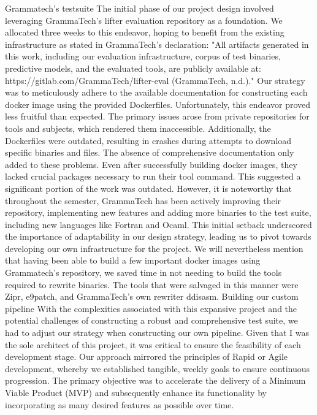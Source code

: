 \documentclass[a4paper,11pt,oneside]{report}
\begin{document}
Grammatech’s testsuite
The initial phase of our project design involved leveraging GrammaTech's lifter
evaluation repository as a foundation. We allocated three weeks to this endeavor, hoping to
benefit from the existing infrastructure as stated in GrammaTech's declaration:
"All artifacts generated in this work, including our evaluation infrastructure, corpus
of test binaries, predictive models, and the evaluated tools, are publicly available at:
https://gitlab.com/GrammaTech/lifter-eval (GrammaTech, n.d.)."
Our strategy was to meticulously adhere to the available documentation for
constructing each docker image using the provided Dockerfiles. Unfortunately, this
endeavor proved less fruitful than expected.
The primary issues arose from private repositories for tools and subjects, which
rendered them inaccessible. Additionally, the Dockerfiles were outdated, resulting in
crashes during attempts to download specific binaries and files. The absence of
comprehensive documentation only added to these problems.
Even after successfully building docker images, they lacked crucial packages
necessary to run their tool command. This suggested a significant portion of the work was
outdated. However, it is noteworthy that throughout the semester, GrammaTech has been
actively improving their repository, implementing new features and adding more binaries to
the test suite, including new languages like Fortran and Ocaml.
This initial setback underscored the importance of adaptability in our design
strategy, leading us to pivot towards developing our own infrastructure for the project. We
will nevertheless mention that having been able to build a few important docker images
using Grammatech’s repository, we saved time in not needing to build the tools required to
rewrite binaries. The tools that were salvaged in this manner were Zipr, e9patch, and
GrammaTech’s own rewriter ddisasm.
Building our custom pipeline
With the complexities associated with this expansive project and the potential
challenges of constructing a robust and comprehensive test suite, we had to adjust our
strategy when constructing our own pipeline. Given that I was the sole architect of this
project, it was critical to ensure the feasibility of each development stage.
Our approach mirrored the principles of Rapid or Agile development, whereby we
established tangible, weekly goals to ensure continuous progression. The primary objective
was to accelerate the delivery of a Minimum Viable Product (MVP) and subsequently
enhance its functionality by incorporating as many desired features as possible over time.
\end{document}
